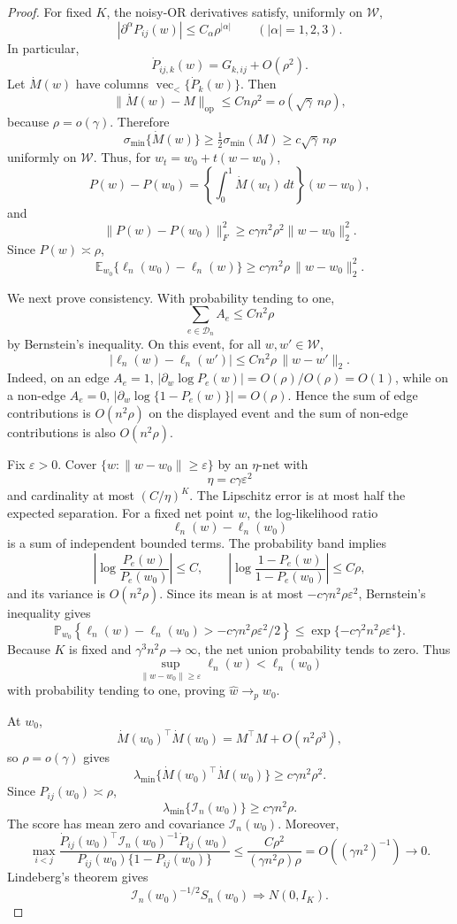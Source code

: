 \documentclass[12pt]{article}
\newcommand{\1}{\mathbf{1}}
\providecommand{\op}{\operatorname{op}}
\providecommand{\vecl}{\operatorname{vec}_{<}}
\providecommand{\Pb}{\mathbb P}
\providecommand{\Eb}{\mathbb E}
\providecommand{\calI}{\mathcal I}
\providecommand{\calW}{\mathcal W}
\begin{document}
\begin{proof}
For fixed \(K\), the noisy-OR derivatives satisfy, uniformly on
\(\calW\),
\[
  |\partial^\alpha P_{ij}(w)|\le C_\alpha \rho^{|\alpha|}
  \qquad(|\alpha|=1,2,3).
\]
In particular,
\[
  \dot P_{ij,k}(w)=G_{k,ij}+O(\rho^2).
\]
Let \(\dot M(w)\) have columns \(\vecl\{\dot P_k(w)\}\).  Then
\[
  \|\dot M(w)-M\|_{\op}\le Cn\rho^2
  =
  o(\sqrt\gamma\,n\rho),
\]
because \(\rho=o(\gamma)\).  Therefore
\[
  \sigma_{\min}\{\dot M(w)\}
  \ge
  \tfrac12\sigma_{\min}(M)
  \ge
  c\sqrt\gamma\,n\rho
\]
uniformly on \(\calW\).  Thus, for \(w_t=w_0+t(w-w_0)\),
\[
  P(w)-P(w_0)
  =
  \left\{\int_0^1\dot M(w_t)\,dt\right\}(w-w_0),
\]
and
\[
  \|P(w)-P(w_0)\|_F^2
  \ge
  c\gamma n^2\rho^2\|w-w_0\|_2^2 .
\]
Since \(P(w)\asymp\rho\),
\[
  \Eb_{w_0}\{\ell_n(w_0)-\ell_n(w)\}
  \ge
  c\gamma n^2\rho\,\|w-w_0\|_2^2 .
\]

We next prove consistency.  With probability tending to one,
\[
  \sum_{e\in\mathcal D_n}A_e\le Cn^2\rho
\]
by Bernstein's inequality.  On this event, for all \(w,w'\in\calW\),
\[
  |\ell_n(w)-\ell_n(w')|
  \le Cn^2\rho\,\|w-w'\|_2 .
\]
Indeed, on an edge \(A_e=1\),
\(|\partial_w\log P_e(w)|=O(\rho)/O(\rho)=O(1)\), while on a non-edge
\(A_e=0\),
\(|\partial_w\log\{1-P_e(w)\}|=O(\rho)\).  Hence the sum of edge
contributions is \(O(n^2\rho)\) on the displayed event and the sum of
non-edge contributions is also \(O(n^2\rho)\).

Fix \(\varepsilon>0\).  Cover
\(\{w:\|w-w_0\|\ge\varepsilon\}\) by an \(\eta\)-net with
\[
  \eta=c\gamma\varepsilon^2
\]
and cardinality at most \((C/\eta)^K\).  The Lipschitz error is at most
half the expected separation.  For a fixed net point \(w\), the
log-likelihood ratio
\[
  \ell_n(w)-\ell_n(w_0)
\]
is a sum of independent bounded terms.  The probability band implies
\[
  \left|
  \log\frac{P_e(w)}{P_e(w_0)}
  \right|\le C,
  \qquad
  \left|
  \log\frac{1-P_e(w)}{1-P_e(w_0)}
  \right|
  \le C\rho ,
\]
and its variance is \(O(n^2\rho)\).  Since its mean is at most
\(-c\gamma n^2\rho\varepsilon^2\), Bernstein's inequality gives
\[
  \Pb_{w_0}
  \left\{
    \ell_n(w)-\ell_n(w_0)
    >
    -c\gamma n^2\rho\varepsilon^2/2
  \right\}
  \le
  \exp\{-c\gamma^2 n^2\rho\varepsilon^4\}.
\]
Because \(K\) is fixed and \(\gamma^3n^2\rho\to\infty\), the net union
probability tends to zero.  Thus
\[
  \sup_{\|w-w_0\|\ge\varepsilon}\ell_n(w)<\ell_n(w_0)
\]
with probability tending to one, proving \(\widehat w\to_p w_0\).

At \(w_0\),
\[
  \dot M(w_0)^\top\dot M(w_0)
  =
  M^\top M+O(n^2\rho^3),
\]
so \(\rho=o(\gamma)\) gives
\[
  \lambda_{\min}\{\dot M(w_0)^\top\dot M(w_0)\}
  \ge
  c\gamma n^2\rho^2 .
\]
Since \(P_{ij}(w_0)\asymp\rho\),
\[
  \lambda_{\min}\{\calI_n(w_0)\}
  \ge c\gamma n^2\rho .
\]
The score has mean zero and covariance \(\calI_n(w_0)\).  Moreover,
\[
  \max_{i<j}
  \frac{
    \dot P_{ij}(w_0)^\top\calI_n(w_0)^{-1}\dot P_{ij}(w_0)
  }{
    P_{ij}(w_0)\{1-P_{ij}(w_0)\}
  }
  \le
  \frac{C\rho^2}{(\gamma n^2\rho)\rho}
  =
  O((\gamma n^2)^{-1})
  \to0.
\]
Lindeberg's theorem gives
\[
  \calI_n(w_0)^{-1/2}S_n(w_0)\Rightarrow N(0,I_K).
\]


\end{proof}
\end{document}
